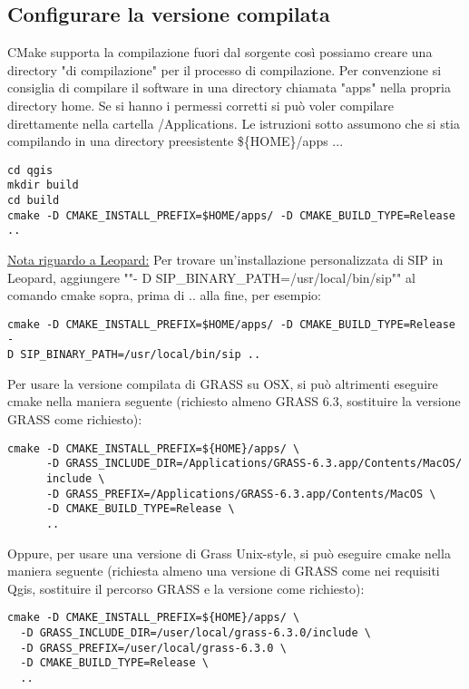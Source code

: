 \subsection{Configurare la versione compilata}
CMake supporta la compilazione fuori dal sorgente così possiamo creare una directory "di compilazione" per il processo di compilazione. Per convenzione si consiglia di compilare il software in una directory chiamata "apps" nella propria directory home. Se si hanno i permessi corretti si può voler compilare direttamente nella cartella /Applications. Le istruzioni sotto assumono che si stia compilando in una directory preesistente \$\{HOME\}/apps ...

\begin{verbatim}
cd qgis
mkdir build
cd build
cmake -D CMAKE_INSTALL_PREFIX=$HOME/apps/ -D CMAKE_BUILD_TYPE=Release ..
\end{verbatim}

\underline{Nota riguardo a Leopard:} Per trovare un'installazione personalizzata di SIP in Leopard, aggiungere ""-
D SIP\_BINARY\_PATH=/usr/local/bin/sip"" al comando cmake sopra, prima di .. alla fine, per esempio:

\begin{verbatim}
cmake -D CMAKE_INSTALL_PREFIX=$HOME/apps/ -D CMAKE_BUILD_TYPE=Release -
D SIP_BINARY_PATH=/usr/local/bin/sip ..
\end{verbatim}

Per usare la versione compilata di GRASS su OSX, si può altrimenti eseguire cmake nella maniera seguente (richiesto almeno GRASS 6.3, sostituire la versione GRASS come richiesto):

\begin{verbatim}
cmake -D CMAKE_INSTALL_PREFIX=${HOME}/apps/ \
      -D GRASS_INCLUDE_DIR=/Applications/GRASS-6.3.app/Contents/MacOS/
      include \
      -D GRASS_PREFIX=/Applications/GRASS-6.3.app/Contents/MacOS \
      -D CMAKE_BUILD_TYPE=Release \
      ..
\end{verbatim}

Oppure, per usare una versione di Grass Unix-style, si può eseguire cmake nella maniera seguente
(richiesta almeno una versione di GRASS come nei requisiti Qgis, sostituire il percorso GRASS e la versione come richiesto):

\begin{verbatim}
cmake -D CMAKE_INSTALL_PREFIX=${HOME}/apps/ \
  -D GRASS_INCLUDE_DIR=/user/local/grass-6.3.0/include \
  -D GRASS_PREFIX=/user/local/grass-6.3.0 \
  -D CMAKE_BUILD_TYPE=Release \
  ..
\end{verbatim}


